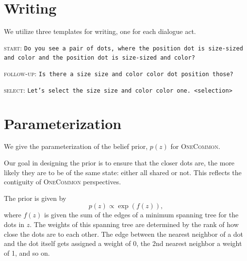 \documentclass[11pt]{article}
\begin{document}
\section{Writing}
\label{sec:templates}
We utilize three templates for writing, one for each dialogue act.

\noindent\textsc{start}: \texttt{Do you see a pair of dots, where the {position} dot is {size}-sized and {color} and the {position} dot is {size}-sized and {color}?}

\noindent\textsc{follow-up}: \texttt{Is there a {size} size and {color} color dot {position} those?}

\noindent\textsc{select}: \texttt{Let's select the {size} size and {color} color one. <selection>}

\section{Parameterization}
\label{sec:parameterization}
We give the parameterization of the belief prior, $p(z)$ for \textsc{OneCommon}.

Our goal in designing the prior is to ensure that the closer dots are, the more likely they are to be of the same state: either all shared or not.
This reflects the contiguity of \textsc{OneCommon} perspectives.

The prior is given by
\begin{equation}
p(z) \propto \exp(f(z)),
\end{equation}
where $f(z)$ is given the sum of the edges of a minimum spanning tree for the dots in $z$. The weights of this spanning tree are determined by the rank of how close the dots are to each other.
The edge between the nearest neighbor of a dot and the dot itself gets assigned a weight of 0, the 2nd nearest neighbor a weight of 1, and so on.
\end{document}
